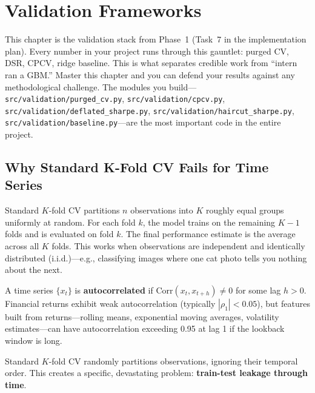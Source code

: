 \chapter{Validation Frameworks}
\label{ch:validation}

\begin{projectconnection}
This chapter is the validation stack from Phase~1 (Task~7 in the implementation plan). Every number in your project runs through this gauntlet: purged CV, DSR, CPCV, ridge baseline. This is what separates credible work from ``intern ran a GBM.'' Master this chapter and you can defend your results against any methodological challenge. The modules you build---\texttt{src/validation/purged\_cv.py}, \texttt{src/validation/cpcv.py}, \texttt{src/validation/deflated\_sharpe.py}, \texttt{src/validation/haircut\_sharpe.py}, \texttt{src/validation/baseline.py}---are the most important code in the entire project.
\end{projectconnection}

\section{Why Standard K-Fold CV Fails for Time Series}
\label{sec:standard-cv-fails}

\begin{prereq}
Standard $K$-fold CV partitions $n$ observations into $K$ roughly equal groups uniformly at random. For each fold $k$, the model trains on the remaining $K-1$ folds and is evaluated on fold $k$. The final performance estimate is the average across all $K$ folds. This works when observations are independent and identically distributed (i.i.d.)---e.g., classifying images where one cat photo tells you nothing about the next.
\end{prereq}

\begin{prereq}[Autocorrelation]
A time series $\{x_t\}$ is \textbf{autocorrelated} if $\text{Corr}(x_t, x_{t+h}) \neq 0$ for some lag $h > 0$. Financial returns exhibit weak autocorrelation (typically $|\rho_1| < 0.05$), but features built from returns---rolling means, exponential moving averages, volatility estimates---can have autocorrelation exceeding 0.95 at lag 1 if the lookback window is long.
\end{prereq}

Standard $K$-fold CV randomly partitions observations, ignoring their temporal order. This creates a specific, devastating problem: \textbf{train-test leakage through time}.

